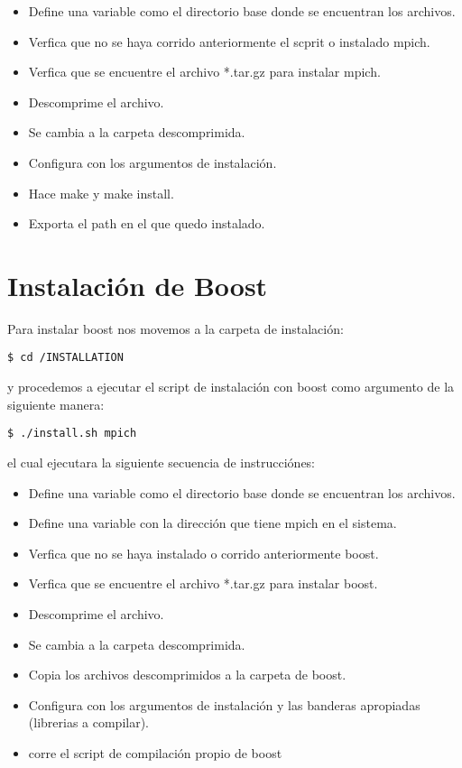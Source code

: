 \begin{itemize}
	\item Define una variable como el directorio base donde se encuentran los archivos.
	\item Verfica que no se haya corrido anteriormente el scprit o instalado mpich.
	\item Verfica que se encuentre el archivo *.tar.gz para instalar mpich.
	\item Descomprime el archivo.
	\item Se cambia a la carpeta descomprimida.
	\item Configura con los argumentos de instalación.
	\item Hace make y make install.
	\item Exporta el path en el que quedo instalado.
\end{itemize}

\newpage



\newpage

\section{Instalación de Boost}

Para instalar boost nos movemos a la carpeta de instalación:

\begin{verbatim}
$ cd /INSTALLATION
\end{verbatim}

y procedemos a ejecutar el script de instalación con boost como argumento de la siguiente manera:

\begin{verbatim}
$ ./install.sh mpich
\end{verbatim}

el cual ejecutara la siguiente secuencia de instrucciónes: 

\begin{itemize}
	\item Define una variable como el directorio base donde se encuentran los archivos.
	\item Define una variable con la dirección que tiene mpich en el sistema.
	\item Verfica que no se haya instalado o corrido anteriormente boost.
	\item Verfica que se encuentre el archivo *.tar.gz para instalar boost.
	\item Descomprime el archivo.
	\item Se cambia a la carpeta descomprimida.
	\item Copia los archivos descomprimidos a la carpeta de boost.
	\item Configura con los argumentos de instalación y las banderas apropiadas (librerias a compilar).
	\item corre el script de compilación propio de boost 
\end{itemize}
	
